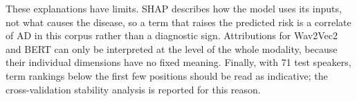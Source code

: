 

These explanations have limits. SHAP describes how the model uses its inputs, not what causes the disease, so a term that raises the predicted risk is a correlate of AD in this corpus rather than a diagnostic sign. Attributions for Wav2Vec2 and BERT can only be interpreted at the level of the whole modality, because their individual dimensions have no fixed meaning. Finally, with 71 test speakers, term rankings below the first few positions should be read as indicative; the cross-validation stability analysis is reported for this reason.




